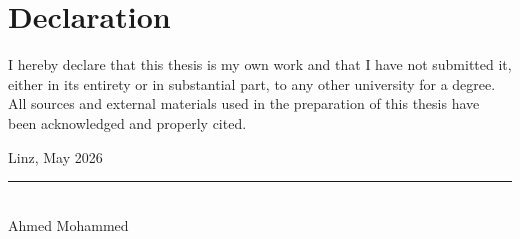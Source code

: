 \cleardoubleoddpage
\chapter*{Declaration}
\label{chap:declaration}

I hereby declare that this thesis is my own work and that I have not submitted it, either in its entirety or in substantial part, to any other university for a degree. All sources and external materials used in the preparation of this thesis have been acknowledged and properly cited.

\vspace{1.5cm}
Linz, May 2026

\vspace{1.5cm}
\rule{5cm}{0.4pt}\\[0.4cm]
Ahmed Mohammed
